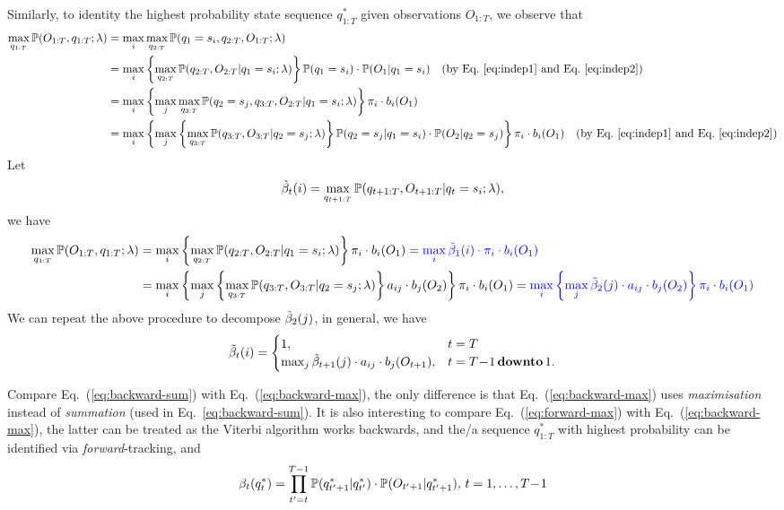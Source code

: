 Similarly, to identity the highest probability state sequence $q_{1:T}^*$ given observations $O_{1:T}$, 
we observe that 
\begin{align*}
\max_{q_{1:T}} \mathbb{P}(O_{1:T}, q_{1:T} ;\lambda) 
&= \max_{i} \max_{q_{2:T}} \mathbb{P}(q_1 = s_i, q_{2:T}, O_{1:T} ;\lambda) \\
&= \max_{i} \left\{ \max_{q_{2:T}} \mathbb{P}(q_{2:T}, O_{2:T} |q_1 = s_i; \lambda) \right\} \mathbb{P}(q_1 = s_i) \cdot \mathbb{P}(O_1 |q_1 = s_i) 
   ~~~ \text{(by Eq.~\ref{eq:indep1} and Eq.~\ref{eq:indep2})} \\
&= \max_{i} \left\{ \max_{j} \max_{q_{3:T}} \mathbb{P}(q_2 = s_j, q_{3:T}, O_{2:T} |q_1 = s_i; \lambda) \right\} \pi_i \cdot b_i(O_1) \\
&= \max_{i} \left\{ \max_{j} \left\{ \max_{q_{3:T}} \mathbb{P}(q_{3:T}, O_{3:T} |q_2 = s_j; \lambda) \right\} \mathbb{P}(q_2 = s_j |q_1 = s_i) \cdot \mathbb{P}(O_2 |q_2 = s_j) 
   \right\} \pi_i \cdot b_i(O_1) 
   ~~~ \text{(by Eq.~\ref{eq:indep1} and Eq.~\ref{eq:indep2})}
\end{align*}
Let 
\begin{equation}
\label{eq:betat}
\tilde{\beta}_t(i) = \max_{q_{t+1:T}} \mathbb{P}(q_{t+1:T}, O_{t+1:T} |q_t = s_i; \lambda),
\end{equation}
we have
\begin{alignat}{2}
\max_{q_{1:T}} \mathbb{P}(O_{1:T}, q_{1:T} ;\lambda) 
&= \max_{i} \left\{ \max_{q_{2:T}} \mathbb{P}(q_{2:T}, O_{2:T} |q_1 = s_i; \lambda) \right\} \pi_i \cdot b_i(O_1) 
 = {\color{blue}{\max_{i} \tilde{\beta}_1(i) \cdot \pi_i \cdot b_i(O_1)}}  \label{eq:max-backward}\\
&= \max_{i} \left\{ \max_{j} \left\{ \max_{q_{3:T}} \mathbb{P}(q_{3:T}, O_{3:T} |q_2 = s_j; \lambda) \right\} a_{ij} \cdot b_j(O_2) \right\} \pi_i \cdot b_i(O_1) 
 = {\color{blue}{\max_{i} \left\{ \max_{j} \tilde{\beta}_2(j) \cdot a_{ij} \cdot b_j(O_2) \right\} \pi_i \cdot b_i(O_1)}}  \nonumber
\end{alignat}
We can repeat the above procedure to decompose $\tilde{\beta}_2(j)$, in general, we have
\begin{equation}
\label{eq:backward-max}
\tilde{\beta}_t(i) = \begin{cases}
              1, & t=T \\
              \max_{j} \tilde{\beta}_{t+1}(j) \cdot a_{ij} \cdot b_j(O_{t+1}), & t=T\!-\!1 \,\textbf{downto}\, 1.
             \end{cases}
\end{equation}

Compare Eq.~(\ref{eq:backward-sum}) with Eq.~(\ref{eq:backward-max}), 
the only difference is that Eq.~(\ref{eq:backward-max}) uses \emph{maximisation} instead of \emph{summation} (used in Eq.~\ref{eq:backward-sum}).
It is also interesting to compare Eq.~(\ref{eq:forward-max}) with Eq.~(\ref{eq:backward-max}), 
the latter can be treated as the Viterbi algorithm works backwards, 
and the/a sequence $q_{1:T}^*$ with highest probability can be identified via \emph{forward}-tracking, and
\begin{equation}
\label{eq:beta-sum}
\beta_t(q_t^*) = \prod_{t'=t}^{T-1} \mathbb{P}(q_{t'+1}^* |q_{t'}^*) \cdot \mathbb{P}(O_{t'+1} |q_{t'+1}^*), \, t = 1,\dots,T\!-\!1
\end{equation}


